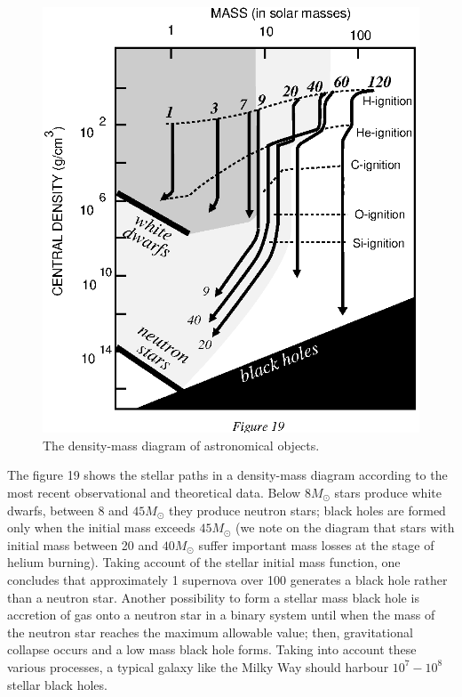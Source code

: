 \documentclass[12pt]{article}
\begin{document}
\begin{figure}[tb]
  \begin{center}
    \leavevmode
    \includegraphics{evol.ps}
    \caption{The density-mass diagram of astronomical objects.}
  \end{center}
\end{figure}
The figure 19 shows the stellar paths in a
density-mass diagram according to the most recent observational and 
theoretical data. Below $8 M_{\odot}$ stars produce white dwarfs, between 8 and $45
M_{\odot}$ they produce neutron stars; black holes are formed only 
when the initial mass
exceeds $45 M_{\odot}$ (we note on the diagram that stars with 
initial mass between 20 and $40 M_{\odot}$ suffer important mass 
losses at the stage of helium burning). 
Taking account of the stellar initial mass function, one concludes that 
approximately 1 supernova
over 100 generates a black hole rather than a neutron star.
Another possibility to form a stellar mass black hole is
accretion of gas onto a neutron star in a binary system until when the mass of
the neutron star reaches the maximum allowable value; then, gravitational 
collapse
occurs and a low mass black hole forms. 
Taking into account these various processes, a typical galaxy like the Milky 
Way should harbour $10^7 - 10^8$ stellar black holes.
\end{document}
